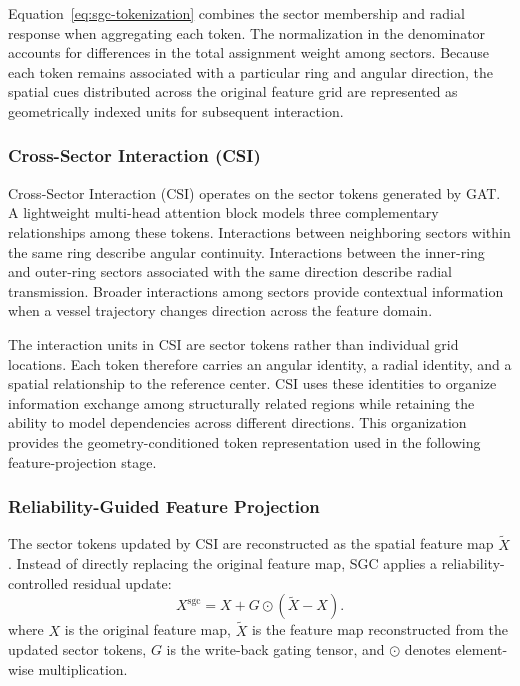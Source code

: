 \documentclass[a4paper,fleqn]{cas-sc}
\begin{document}
Equation~\eqref{eq:sgc-tokenization} combines the sector membership and radial response when aggregating each token.
The normalization in the denominator accounts for differences in the total assignment weight among sectors.
Because each token remains associated with a particular ring and angular direction, the spatial cues distributed across the original feature grid are represented as geometrically indexed units for subsequent interaction.

\subsubsection{Cross-Sector Interaction (CSI)}

Cross-Sector Interaction (CSI) operates on the sector tokens generated by GAT.
A lightweight multi-head attention block models three complementary relationships among these tokens.
Interactions between neighboring sectors within the same ring describe angular continuity.
Interactions between the inner-ring and outer-ring sectors associated with the same direction describe radial transmission.
Broader interactions among sectors provide contextual information when a vessel trajectory changes direction across the feature domain.

The interaction units in CSI are sector tokens rather than individual grid locations.
Each token therefore carries an angular identity, a radial identity, and a spatial relationship to the reference center.
CSI uses these identities to organize information exchange among structurally related regions while retaining the ability to model dependencies across different directions.
This organization provides the geometry-conditioned token representation used in the following feature-projection stage.

\subsubsection{Reliability-Guided Feature Projection}

The sector tokens updated by CSI are reconstructed as the spatial feature map \(\tilde{X}\).
Instead of directly replacing the original feature map, SGC applies a reliability-controlled residual update:
\begin{equation}
    X^{\mathrm{sgc}} = X + G \odot (\tilde{X} - X).
    \label{eq:sgc-projection}
\end{equation}
where \(X\) is the original feature map, \(\tilde{X}\) is the feature map reconstructed from the updated sector tokens, \(G\) is the write-back gating tensor, and \(\odot\) denotes element-wise multiplication.
\end{document}

